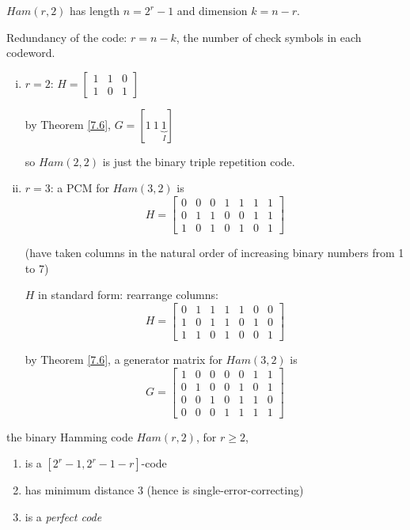 \documentclass{article}
\theoremstyle{definition}
\newenvironment{thm}[1]
{\renewcommand\theinnerthm{#1}\innerthm}
{\endinnerthm}
\newenvironment{ex}[1]
{\renewcommand\theinnerex{#1}\innerex}
{\endinnerex}
\newenvironment{remark}[1]
{\renewcommand\theinnerrem{#1}\innerrem}
{\endinnerrem}
\begin{document}
\begin{remark}{}
  $Ham(r, 2)$ has length $n=2^r-1$ and dimension $k = n-r$.

  Redundancy of the code: $r=n-k$, the number of check symbols in each codeword.
\end{remark}


\begin{ex}{8.1}  
  \begin{enumerate}[i.]
    \item $r = 2$: $H = \begin{bmatrix}1 & 1 & 0\\ 1 & 0 & 1 \end{bmatrix}$

      by Theorem \ref{7.6}, $G = [1\ 1\ \underbrace{1}_{I}]$

      so $Ham(2, 2)$ is just the binary triple repetition code.  

    \item $r = 3$: a PCM for $Ham(3, 2)$ is  
      $$H =
      \begin{bmatrix}
        0 & 0 & 0 & 1 & 1 & 1 & 1 \\
        0 & 1 & 1 & 0 & 0 & 1 & 1 \\
        1 & 0 & 1 & 0 & 1 & 0 & 1
      \end{bmatrix}$$

      (have taken columns in the natural order of increasing binary numbers from 1 to 7)

      $H$ in standard form: rearrange columns:
      $$H =
      \begin{bmatrix}
        0 & 1 & 1 & 1 & 1 & 0 & 0 \\
        1 & 0 & 1 & 1 & 0 & 1 & 0 \\
        1 & 1 & 0 & 1 & 0 & 0 & 1
      \end{bmatrix}$$

      by Theorem \ref{7.6}, a generator matrix for $Ham(3, 2)$ is  
      $$
      G =
      \begin{bmatrix}
        1 & 0 & 0 & 0 & 0 & 1 & 1 \\
        0 & 1 & 0 & 0 & 1 & 0 & 1 \\
        0 & 0 & 1 & 0 & 1 & 1 & 0 \\
        0 & 0 & 0 & 1 & 1 & 1 & 1
      \end{bmatrix}
      $$
  \end{enumerate}
\end{ex}


\begin{thm}{8.2}
  the binary Hamming code $Ham(r,2)$, for $r \geq 2$,
  \begin{enumerate}
    \item is a $[2^r -1, 2^r-1-r]$-code
    \item has minimum distance $3$ (hence is single-error-correcting)
    \item is a \emph{perfect code}
  \end{enumerate}
\end{thm}
\end{document}
